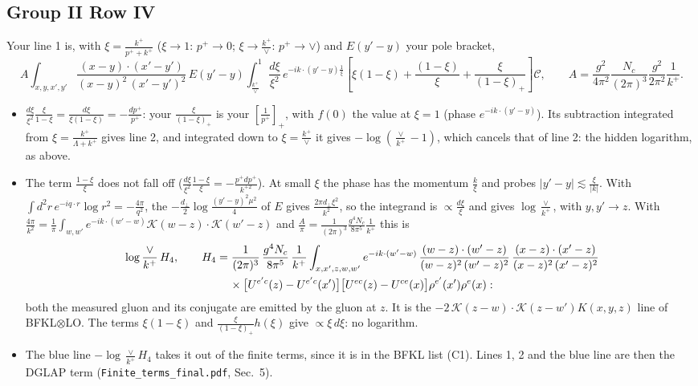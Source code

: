 \subsection{Group II Row IV}
Your line 1 is, with $\xi=\frac{k^+}{p^++k^+}$ ($\xi\to1$: $p^+\to0$; $\xi\to\frac{k^+}{\vee}$: $p^+\to\vee$) and $E(y'-y)$ your pole bracket,
\begin{equation*}
A\int_{x,y,x',y'}\frac{(x-y)\cdot (x'-y')}{(x-y)^{2}\,(x'-y')^{2}}\,E(y'-y)\int_{\frac{k^{+}}{\vee}}^{1}\frac{d\xi}{\xi^{2}}\,e^{-ik\cdot (y'-y)\frac{1}{\xi}}\left[\xi(1-\xi)+\frac{(1-\xi)}{\xi}+\frac{\xi}{(1-\xi)_{+}}\right]\mathcal C,\qquad A=\frac{g^{2}}{4\pi^{2}}\frac{N_{c}}{(2\pi)^{3}}\frac{g^{2}}{2\pi^{2}}\frac{1}{k^{+}}.
\end{equation*}
\begin{itemize}
\item $\frac{d\xi}{\xi^2}\frac{\xi}{1-\xi}=\frac{d\xi}{\xi(1-\xi)}=-\frac{dp^+}{p^+}$: your $\frac{\xi}{(1-\xi)_+}$ is your $\left[\frac{1}{p^+}\right]_+$, with $f(0)$ the value at $\xi=1$ (phase $e^{-ik\cdot(y'-y)}$). Its subtraction integrated from $\xi=\frac{k^+}{\Lambda+k^+}$ gives line 2, and integrated down to $\xi=\frac{k^+}{\vee}$ it gives $-\log(\frac{\vee}{k^+}-1)$, which cancels that of line 2: the hidden logarithm, as above.
\item The term $\frac{1-\xi}{\xi}$ does not fall off ($\frac{d\xi}{\xi^2}\frac{1-\xi}{\xi}=-\frac{p^+dp^+}{k^{+2}}$). At small $\xi$ the phase has the momentum $\frac{k}{\xi}$ and probes $|y'-y|\lesssim\frac{\xi}{|k|}$. With $\int d^2r\,e^{-iq\cdot r}\log r^2=-\frac{4\pi}{q^2}$, the $-\frac{d_\perp}{2}\log\frac{(y'-y)^2\mu^2}{4}$ of $E$ gives $\frac{2\pi d_\perp\xi^2}{k^2}$, so the integrand is $\propto\frac{d\xi}{\xi}$ and gives $\log\frac{\vee}{k^+}$, with $y,y'\to z$. With $\frac{4\pi}{k^2}=\frac1\pi\int_{w,w'}e^{-ik\cdot(w'-w)}\mathcal K(w-z)\cdot\mathcal K(w'-z)$ and $\frac{A}{\pi}=\frac{1}{(2\pi)^3}\frac{g^4N_c}{8\pi^5}\frac{1}{k^+}$ this is
\begin{align*}
&\log\frac{\vee}{k^+}\,H_4,\qquad H_4=\frac{1}{(2\pi)^{3}}\,\frac{g^{4}N_{c}}{8\pi^{5}}\,\frac{1}{k^{+}}\int_{x,x',z,w,w'}e^{-ik\cdot (w'-w)}\,\frac{(w-z)\cdot(w'-z)}{(w-z)^{2}\,(w'-z)^{2}}\,\frac{(x-z)\cdot(x'-z)}{(x-z)^{2}\,(x'-z)^{2}}\\
&\hphantom{\log\frac{\vee}{k^+}\,H_4,\qquad H_4={}}\times\big[U^{e'c}(z)-U^{e'c}(x')\big]\big[U^{ec}(z)-U^{ce}(x)\big]\rho^{e'}(x')\rho^{e}(x):
\end{align*}
both the measured gluon and its conjugate are emitted by the gluon at $z$. It is the $-2\,\mathcal K(z-w)\cdot\mathcal K(z-w')K(x,y,z)$ line of BFKL$\otimes$LO. The terms $\xi(1-\xi)$ and $\frac{\xi}{(1-\xi)_+}h(\xi)$ give $\propto\xi\,d\xi$: no logarithm.
\item The blue line $-\log\frac{\vee}{k^+}H_4$ takes it out of the finite terms, since it is in the BFKL list (C1). Lines 1, 2 and the blue line are then the DGLAP term (\texttt{Finite\_terms\_final.pdf}, Sec.~5).
\end{itemize}
